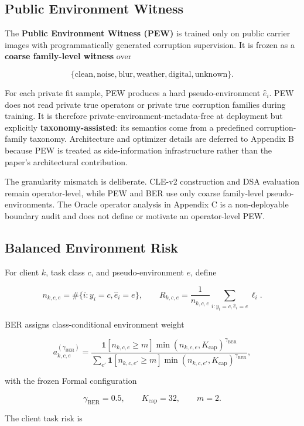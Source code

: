 \documentclass[10pt,twocolumn]{article}
\begin{document}
\subsection{Public Environment Witness}

The \textbf{Public Environment Witness (PEW)} is trained only on public carrier images with programmatically generated corruption supervision. It is frozen as a \textbf{coarse family-level witness} over

\[
\{\text{clean},\text{noise},\text{blur},\text{weather},\text{digital},\text{unknown}\}.
\]

For each private fit sample, PEW produces a hard pseudo-environment \(\hat e_i\). PEW does not read private true operators or private true corruption families during training. It is therefore private-environment-metadata-free at deployment but explicitly \textbf{taxonomy-assisted}: its semantics come from a predefined corruption-family taxonomy. Architecture and optimizer details are deferred to Appendix B because PEW is treated as side-information infrastructure rather than the paper's architectural contribution.

The granularity mismatch is deliberate. CLE-v2 construction and DSA evaluation remain operator-level, while PEW and BER use only coarse family-level pseudo-environments. The Oracle operator analysis in Appendix C is a non-deployable boundary audit and does not define or motivate an operator-level PEW.

\subsection{Balanced Environment Risk}

For client \(k\), task class \(c\), and pseudo-environment \(e\), define

\[
n_{k,c,e}=\#\{i:y_i=c,\hat e_i=e\},
\qquad
R_{k,c,e}=\frac1{n_{k,c,e}}\sum_{i:y_i=c,\hat e_i=e}\ell_i.
\]

BER assigns class-conditional environment weight

\[
a^{(\gamma_{\mathrm{BER}})}_{k,c,e}
=
\frac{
\mathbf 1[n_{k,c,e}\ge m]
\min(n_{k,c,e},K_{\mathrm{cap}})^{\gamma_{\mathrm{BER}}}
}{
\sum_{e'}
\mathbf 1[n_{k,c,e'}\ge m]
\min(n_{k,c,e'},K_{\mathrm{cap}})^{\gamma_{\mathrm{BER}}}
},
\]

with the frozen Formal configuration

\[
\gamma_{\mathrm{BER}}=0.5,\qquad K_{\mathrm{cap}}=32,\qquad m=2.
\]

The client task risk is
\end{document}
